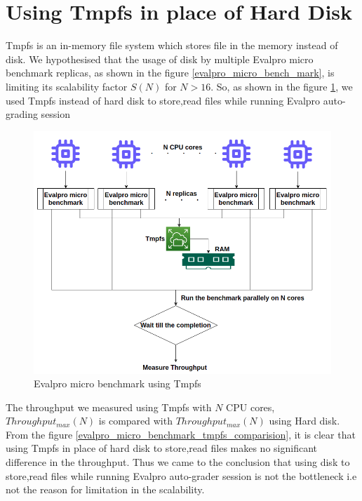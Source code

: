 \documentclass{iitbreport}
\begin{document}
\section{Using Tmpfs in place of Hard Disk}
Tmpfs \cite{tmpfs} is an in-memory file system which stores file in the memory instead of disk. We hypothesised that the usage of disk by multiple Evalpro micro benchmark replicas, as shown in the figure \ref{evalpro_micro_bench_mark}, is limiting its scalability factor $S(N)$ for $N>16$. So, as shown in the figure \ref{evalpro_micro_benchmark_tmpfs}, we used Tmpfs instead of hard disk to store,read files while running Evalpro auto-grading session
\begin{figure}[!htb]
  \centering
  \includegraphics[width=\linewidth]{Images/evalpro_micro_benchmatk_tmpfs.png}
  \caption{ Evalpro micro benchmark using Tmpfs}
  \label{evalpro_micro_benchmark_tmpfs}
\end{figure}


The throughput we measured using Tmpfs with $N$ CPU cores, $Throughput_{max}(N)$ is compared with $Throughput_{max}(N)$ using Hard disk. From the figure \ref{evalpro_micro_benchmark_tmpfs_comparision}, it is clear that using Tmpfs in place of hard disk to store,read files  makes no significant difference in the throughput. Thus we came to the conclusion that using disk to store,read files while running Evalpro auto-grader session is not the bottleneck i.e not the reason for limitation in the scalability.
\end{document}
